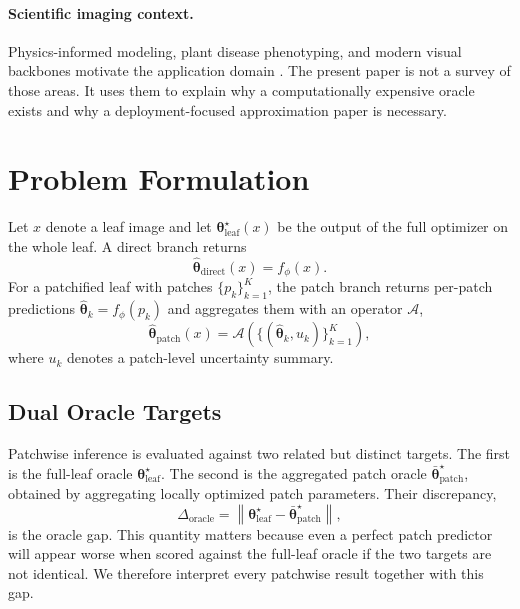 \documentclass[11pt,a4paper]{article}
\newcommand{\btheta}{\boldsymbol{\theta}}
\begin{document}
\paragraph{Scientific imaging context.}
Physics-informed modeling, plant disease phenotyping, and modern visual backbones motivate the application domain \citep{B_raissi2019,B_mahlein2016,B_he2016,B_oquab2024}.
The present paper is not a survey of those areas.
It uses them to explain why a computationally expensive oracle exists and why a deployment-focused approximation paper is necessary.

\section{Problem Formulation}
Let $x$ denote a leaf image and let $\btheta^{\star}_{\mathrm{leaf}}(x)$ be the output of the full optimizer on the whole leaf.
A direct branch returns
\begin{equation}
\hat{\btheta}_{\mathrm{direct}}(x)=f_\phi(x).
\end{equation}
For a patchified leaf with patches $\{p_k\}_{k=1}^{K}$, the patch branch returns per-patch predictions $\hat{\btheta}_k=f_\phi(p_k)$ and aggregates them with an operator $\mathcal{A}$,
\begin{equation}
\hat{\btheta}_{\mathrm{patch}}(x)=\mathcal{A}\left(\{(\hat{\btheta}_k,u_k)\}_{k=1}^{K}\right),
\end{equation}
where $u_k$ denotes a patch-level uncertainty summary.

\subsection{Dual Oracle Targets}
Patchwise inference is evaluated against two related but distinct targets.
The first is the full-leaf oracle $\btheta^{\star}_{\mathrm{leaf}}$.
The second is the aggregated patch oracle $\bar{\btheta}^{\star}_{\mathrm{patch}}$, obtained by aggregating locally optimized patch parameters.
Their discrepancy,
\begin{equation}
\Delta_{\mathrm{oracle}}=\left\lVert \btheta^{\star}_{\mathrm{leaf}}-\bar{\btheta}^{\star}_{\mathrm{patch}}\right\rVert,
\end{equation}
is the oracle gap.
This quantity matters because even a perfect patch predictor will appear worse when scored against the full-leaf oracle if the two targets are not identical.
We therefore interpret every patchwise result together with this gap.
\end{document}
